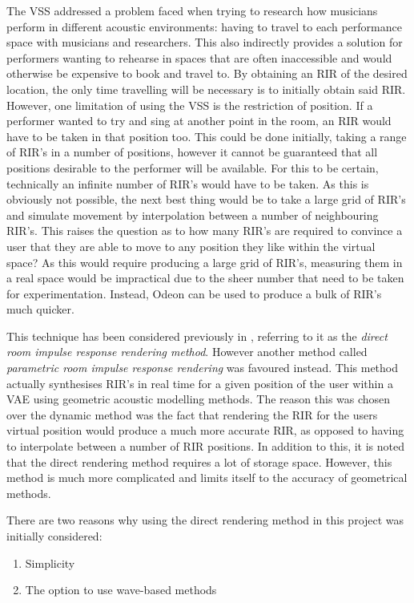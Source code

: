 \documentclass[../../main.tex]{subfiles}
\begin{document}
		The \ac{VSS} addressed a problem faced when trying to research how musicians perform in different acoustic environments: having to travel to each performance space with musicians and researchers. This also indirectly provides a solution for performers wanting to rehearse in spaces that are often inaccessible and would otherwise be expensive to book and travel to. By obtaining an \ac{RIR} of the desired location, the only time travelling will be necessary is to initially obtain said \ac{RIR}. However, one limitation of using the \ac{VSS} is the restriction of position. If a performer wanted to try and sing at another point in the room, an \ac{RIR} would have to be taken in that position too. This could be done initially, taking a range of \ac{RIR}'s in a number of positions, however it cannot be guaranteed that all positions desirable to the performer will be available. For this to be certain, technically an infinite number of \ac{RIR}'s would have to be taken. As this is obviously not possible, the next best thing would be to take a large grid of \ac{RIR}'s and simulate movement by interpolation between a number of neighbouring \ac{RIR}'s. This raises the question as to how many \ac{RIR}'s are required to convince a user that they are able to move to any position they like within the virtual space? As this would require producing a large grid of \ac{RIR}'s, measuring them in a real space would be impractical due to the sheer number that need to be taken for experimentation. Instead, Odeon can be used to produce a bulk of \ac{RIR}'s much quicker.

		This technique has been considered previously in \cite{Savioja1999}, referring to it as the \textit{direct room impulse response rendering method}. However another method called \textit{parametric room impulse response rendering} was favoured instead. This method actually synthesises \ac{RIR}'s in real time for a given position of the user within a \ac{VAE} using geometric acoustic modelling methods. The reason this was chosen over the dynamic method was the fact that rendering the \ac{RIR} for the users virtual position would produce a much more accurate \ac{RIR}, as opposed to having to interpolate between a number of \ac{RIR} positions. In addition to this, it is noted that the direct rendering method requires a lot of storage space. However, this method is much more complicated and limits itself to the accuracy of geometrical methods.

		There are two reasons why using the direct rendering method in this project was initially considered: 
		\begin{enumerate}
			\item Simplicity
			\item The option to use wave-based methods
		\end{enumerate}
\end{document}
